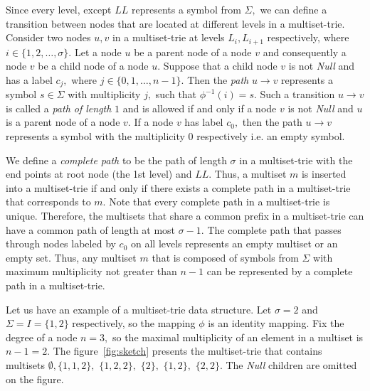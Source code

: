 Since every level, except $LL$ represents a symbol from $\Sigma,$ we can define 
a transition between nodes that are located at different levels in a multiset-trie. 
%
Consider two nodes $u,v$ in a multiset-trie at levels $L_i, L_{i+1}$ respectively, 
where $i\in\{1,2,\ldots,\sigma\}.$ Let a node $u$ be a parent node of a node $v$ 
and consequently a node $v$ be a child node of a node $u.$ Suppose that a child 
node $v$ is not \emph{Null} and has a label $c_j,$ where $j\in\{ 0,1,\ldots, n-1 \}.$ 
%
Then the \emph{path} $u\rightarrow v$ represents a symbol $s\in\Sigma$ with 
multiplicity $j,$ such that $\phi^{-1}(i) = s.$ 
%
Such a transition $u\rightarrow v$ is called a \emph{path of length} $1$ and is 
allowed if and only if a node $v$ is not \emph{Null} and $u$ is a parent node of 
a node $v.$ If a node $v$ has label $c_0,$ then the path $u\rightarrow v$ 
represents a symbol with the multiplicity $0$ respectively i.e. an empty symbol.

We define a \emph{complete path} to be the path of length $\sigma$ in a 
multiset-trie with the end points at root node (the 1st level) and $LL$. Thus, 
a multiset $m$ is inserted into a multiset-trie if and only if there exists a 
complete path in a multiset-trie that corresponds to $m.$
%
Note that every complete path in a multiset-trie is unique. Therefore, the multisets 
that share a common prefix in a multiset-trie can have a common path of length at 
most $\sigma-1.$ The complete path that passes through nodes labeled by $c_0$ 
on all levels represents an empty multiset or an empty set.
%
Thus, any multiset $m$ that is composed of symbols from $\Sigma$ with maximum 
multiplicity not greater than $n-1$ can be represented by a complete path in a multiset-trie.

Let us have an example of a multiset-trie data structure. Let $\sigma = 2$ and 
$\Sigma = I = \{ 1,2 \}$ respectively, so the mapping $\phi$ is an identity mapping. 
Fix the degree of a node $n=3,$ so the maximal multiplicity of an element in 
a multiset is $n-1=2.$ The figure~\ref{fig:sketch} presents the multiset-trie that 
contains multisets $\emptyset, \{ 1,1,2 \},$ $\{ 1,2,2 \},$ $\{ 2 \},$ $\{ 1,2 \},$ $\{ 2,2 \}.$ 
The \emph{Null} children are omitted on the figure.

